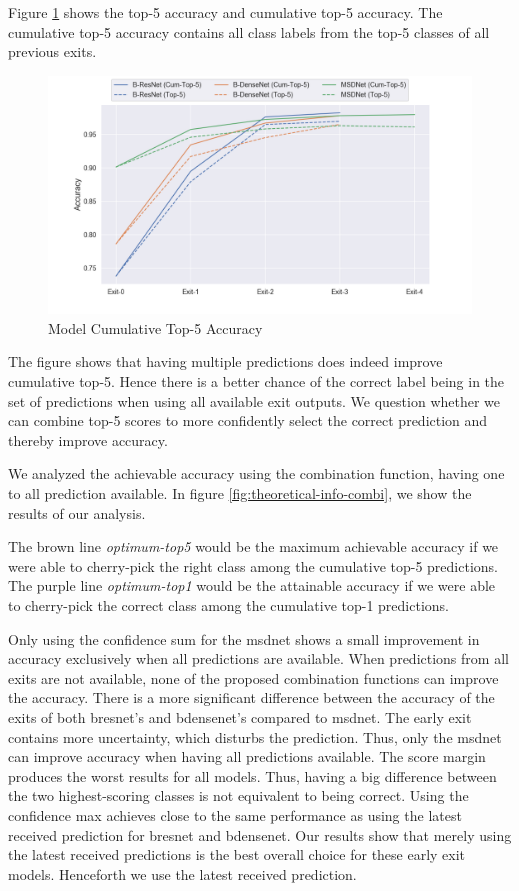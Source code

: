 Figure \ref{fig:top-5-cumulative}  shows the top-5 accuracy and cumulative top-5 accuracy. The cumulative top-5 accuracy contains all class labels from the top-5 classes of all previous exits. 
\begin{figure}
	\centering
	\includegraphics[width=.8\linewidth]{figures/edge/top5cumulative}
	\caption[Top-5 Cumulative]{Model Cumulative Top-5 Accuracy}
	\label{fig:top-5-cumulative}
\end{figure}

The figure shows that having multiple predictions does indeed improve cumulative top-5. Hence there is a better chance of the correct label being in the set of predictions when using all available exit outputs. We question whether we can combine top-5 scores to more confidently select the correct prediction and thereby improve accuracy. 

We analyzed the achievable accuracy using the combination function, having one to all prediction available. In figure \ref{fig:theoretical-info-combi}, we show the results of our analysis.  

The brown line \textit{optimum-top5} would be the maximum achievable accuracy if we were able to cherry-pick the right class among the cumulative top-5 predictions. The purple line \textit{optimum-top1} would be the attainable accuracy if we were able to cherry-pick the correct class among the cumulative top-1 predictions.

Only using the confidence sum for the \gls{msdnet} shows a small improvement in accuracy exclusively when all predictions are available. When predictions from all exits are not available, none of the proposed combination functions can improve the accuracy. There is a more significant difference between the accuracy of the exits of both \gls{bresnet}'s and \gls{bdensenet}'s compared to \gls{msdnet}. The early exit contains more uncertainty, which disturbs the prediction. Thus, only the \gls{msdnet} can improve accuracy when having all predictions available.
The score margin produces the worst results for all models. Thus, having a big difference between the two highest-scoring classes is not equivalent to being correct. Using the confidence max achieves close to the same performance as using the latest received prediction for \gls{bresnet} and \gls{bdensenet}. Our results show that merely using the latest received predictions is the best overall choice for these early exit models. Henceforth we use the latest received prediction.

